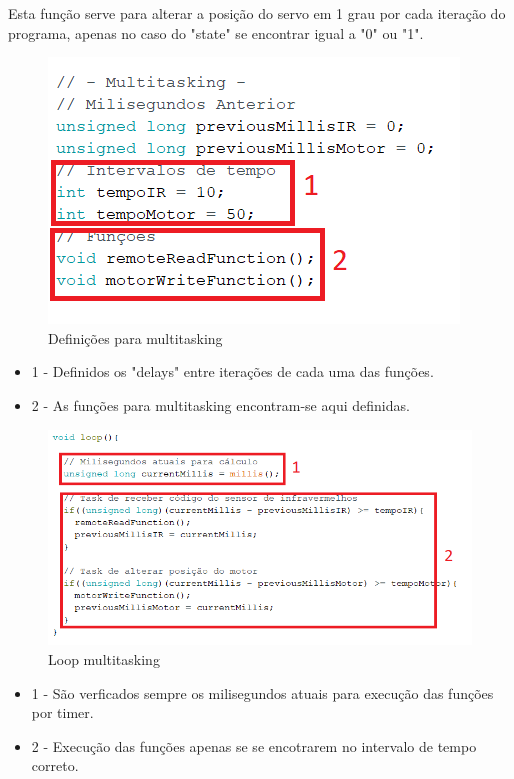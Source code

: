 Esta função serve para alterar a posição do servo em 1 grau por cada iteração do programa, apenas no caso do "state" se encontrar igual a "0" ou "1".


\begin{figure}[H]
    \centering
    \includegraphics[scale=0.6]{images/codigo/sisC_definicaoMultitasking.png}
    \caption{Definições para multitasking}
\end{figure}

\begin{itemize}
    \item 1 - Definidos os "delays" entre iterações de cada uma das funções.
    \item 2 - As funções para multitasking encontram-se aqui definidas.
\end{itemize}

\begin{figure}[H]
    \centering
    \includegraphics[scale=0.6]{images/codigo/sisC_multitaskingLoop.png}
    \caption{Loop multitasking}
\end{figure}

\begin{itemize}
    \item 1 - São verficados sempre os milisegundos atuais para execução das funções por timer.
    \item 2 - Execução das funções apenas se se encotrarem no intervalo de tempo correto.
\end{itemize}